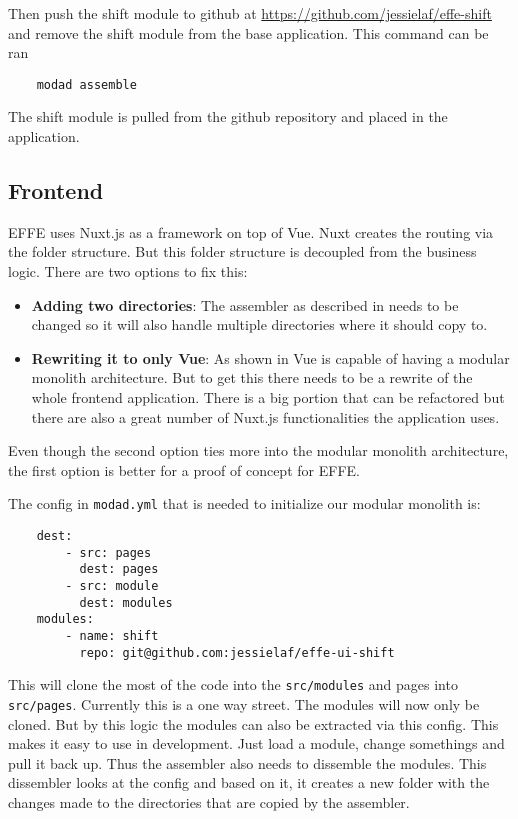 Then push the shift module to github at \url{https://github.com/jessielaf/effe-shift} and remove the shift module from the base application. This command can be ran
\begin{verbatim}
    modad assemble
\end{verbatim}

The shift module is pulled from the github repository and placed in the application.

\subsection{Frontend}

EFFE uses Nuxt.js as a framework on top of Vue. Nuxt creates the routing via the folder structure. But this folder structure is decoupled from the business logic. There are two options to fix this:

\begin{itemize}
    \item \textbf{Adding two directories}: The assembler as described in  needs to be changed so it will also handle multiple directories where it should copy to.
    \item \textbf{Rewriting it to only Vue}: As shown in  Vue is capable of having a modular monolith architecture. But to get this there needs to be a rewrite of the whole frontend application. There is a big portion that can be refactored but there are also a great number of Nuxt.js functionalities the application uses.
\end{itemize}

Even though the second option ties more into the modular monolith architecture, the first option is better for a proof of concept for EFFE.

The config in \texttt{modad.yml} that is needed to initialize our modular monolith is:
\begin{verbatim}
    dest:
        - src: pages
          dest: pages
        - src: module
          dest: modules
    modules:
        - name: shift
          repo: git@github.com:jessielaf/effe-ui-shift
\end{verbatim}

This will clone the most of the code into the \texttt{src/modules} and pages into \texttt{src/pages}. Currently this is a one way street. The modules will now only be cloned. But by this logic the modules can also be extracted via this config. This makes it easy to use in development. Just load a module, change somethings and pull it back up. Thus the assembler also needs to dissemble the modules. This dissembler looks at the config and based on it, it creates a new folder with the changes made to the directories that are copied by the assembler.

